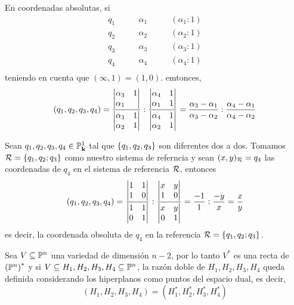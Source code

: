 \begin{obs}
  En coordenadas absolutas, si 
  \[
    \begin{aligned}
      q_1 &\qquad \alpha_1 &\qquad (\alpha_1:1) \\
      q_2 &\qquad \alpha_2 &\qquad (\alpha_2:1) \\
      q_3 &\qquad \alpha_3 &\qquad (\alpha_3:1) \\
      q_4 &\qquad \alpha_4 &\qquad (\alpha_4:1) \\
    \end{aligned}
  \]
  teniendo en cuenta que $(\infty,1) = (1,0)$. emtonces, 
  \[
    \left( q_1,q_2,q_3,q_4 \right) = \frac{\begin{vmatrix}\alpha_3 & 1 \\ \alpha_1 & \end{vmatrix}}
    {\begin{vmatrix}\alpha_3 & 1 \\ \alpha_2 & 1\end{vmatrix}}:\frac{\begin{vmatrix}\alpha_4 & 1 \\ \alpha_1 & 1\end{vmatrix}}
    {\begin{vmatrix}\alpha_4 & 1 \\ \alpha_2 & 1\end{vmatrix}} = 
    \frac{\alpha_3-\alpha_1}{\alpha_3-\alpha_2}:\frac{\alpha_4-\alpha_1}{\alpha_4-\alpha_2}
  \]
\end{obs}
\begin{obs}\label{obs:rzdo_ref}
  Sean $q_1,q_2,q_3,q_4 \in \mathbb{P}^1_{\mathbf{k}}$ tal que $\left\{q_1,q_2,q_3\right\}$ son diferentes dos a dos.
  Tomamos $\mathcal{R} = \left\{q_1,q_2;q_3\right\}$ como nuestro sistema de referncia y sean $(x,y)_{\mathcal{R}} = q_4$ 
  las coordenadas de $q_4$ en el sistema de referencia $\mathcal{R}$, entonces
  \[
    \left( q_1,q_2,q_3,q_4 \right) = \frac{\begin{vmatrix}1 & 1 \\ 1 & 0\end{vmatrix}}
    {\begin{vmatrix}1 & 1 \\ 0 & 1\end{vmatrix}}:\frac{\begin{vmatrix}x & y \\ 1 & 0\end{vmatrix}}
    {\begin{vmatrix}x & y \\ 0 & 1\end{vmatrix}} = \frac{-1}{1}:\frac{-y}{x} = \frac{x}{y}
  \]
  es decir, la coordenada obsoluta de $q_4$ en la referencia $\mathcal{R} = \left\{q_1,q_2;q_3\right\}$.
\end{obs}
\begin{obs}
 Sea $V \subseteq \mathbb{P}^n$ una variedad de dimensión $n-2$, por lo tanto $V^*$ es una recta de
 $\left( \mathbb{P}^n \right)^*$ y si $V \subseteq H_1,H_2,H_3,H_4 \subseteq \mathbb{P}^n$, la razón doble
 de $H_1,H_2,H_3,H_4$ queda definida considerando los hiperplanos como puntos del espacio dual,
 es decir,
 \[
  (H_1,H_2,H_3,H_4) = (H_1^*,H_2^*,H_3^*,H_4^*)
 \]
\end{obs}

